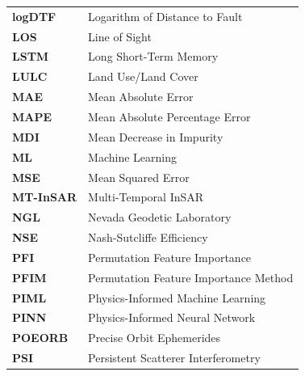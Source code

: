 \documentclass[oneside,doublespacing,flushright]{lsuthesis}
\begin{document}
\newpage
\noindent
\begin{tabular}{@{}l@{\hspace{4em}}l@{}}
\textbf{logDTF} & Logarithm of Distance to Fault \\
\textbf{LOS} & Line of Sight \\
\textbf{LSTM} & Long Short-Term Memory \\
\textbf{LULC} & Land Use/Land Cover \\
\textbf{MAE} & Mean Absolute Error \\
\textbf{MAPE} & Mean Absolute Percentage Error \\
\textbf{MDI} & Mean Decrease in Impurity \\
\textbf{ML} & Machine Learning \\
\textbf{MSE} & Mean Squared Error \\
\textbf{MT-InSAR} & Multi-Temporal InSAR \\
\textbf{NGL} & Nevada Geodetic Laboratory \\
\textbf{NSE} & Nash-Sutcliffe Efficiency \\
\textbf{PFI} & Permutation Feature Importance \\
\textbf{PFIM} & Permutation Feature Importance Method \\
\textbf{PIML} & Physics-Informed Machine Learning \\
\textbf{PINN} & Physics-Informed Neural Network \\
\textbf{POEORB} & Precise Orbit Ephemerides \\
\textbf{PSI} & Persistent Scatterer Interferometry \\
\end{tabular}
\end{document}
